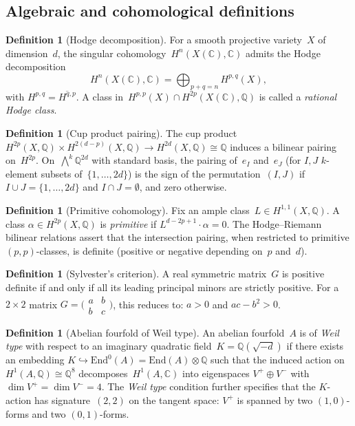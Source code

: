 \documentclass[11pt]{article}
\theoremstyle{plain}
\theoremstyle{definition}
\newtheorem{definition}[theorem]{Definition}
\theoremstyle{remark}
\newcommand{\Q}{\mathbb{Q}}
\newcommand{\C}{\mathbb{C}}
\newcommand{\End}{\mathrm{End}}
\begin{document}
\subsection{Algebraic and cohomological definitions}

\begin{definition}[Hodge decomposition]
For a smooth projective variety~$X$ of dimension~$d$, the singular
cohomology~$H^n(X(\C),\C)$ admits the Hodge decomposition
\[
  H^n(X(\C),\C) = \bigoplus_{p+q=n} H^{p,q}(X),
\]
with $H^{p,q} = \overline{H^{q,p}}$.  A class in~$H^{p,p}(X) \cap
H^{2p}(X(\C),\Q)$ is called a \emph{rational Hodge class}.
\end{definition}

\begin{definition}[Cup product pairing]
\label{def:cup}
The cup product
$H^{2p}(X,\Q) \times H^{2(d-p)}(X,\Q) \to H^{2d}(X,\Q) \cong \Q$
induces a bilinear pairing on~$H^{2p}$.  On~$\bigwedge^k \Q^{2d}$ with
standard basis, the pairing of~$e_I$ and~$e_J$ (for $I, J$ $k$-element
subsets of~$\{1,\ldots,2d\}$) is the sign of the permutation~$(I,J)$ if
$I \cup J = \{1,\ldots,2d\}$ and $I \cap J = \emptyset$, and zero otherwise.
\end{definition}

\begin{definition}[Primitive cohomology]
\label{def:primitive}
Fix an ample class~$L \in H^{1,1}(X,\Q)$.  A class
$\alpha \in H^{2p}(X,\Q)$ is \emph{primitive} if
$L^{d-2p+1} \cdot \alpha = 0$.  The Hodge--Riemann bilinear relations
assert that the intersection pairing, when restricted to primitive
$(p,p)$-classes, is definite (positive or negative depending on~$p$
and~$d$).
\end{definition}

\begin{definition}[Sylvester's criterion]
\label{def:sylvester}
A real symmetric matrix~$G$ is positive definite if and only if all its
leading principal minors are strictly positive.  For a $2 \times 2$ matrix
$G = \bigl(\begin{smallmatrix} a & b \\ b & c \end{smallmatrix}\bigr)$,
this reduces to: $a > 0$ and $ac - b^2 > 0$.
\end{definition}

\begin{definition}[Abelian fourfold of Weil type]
\label{def:weil-type}
An abelian fourfold~$A$ is of \emph{Weil type} with respect to an imaginary
quadratic field~$K = \Q(\sqrt{-d})$ if there exists an embedding
$K \hookrightarrow \End^0(A) = \End(A) \otimes \Q$ such that the induced
action on~$H^1(A,\Q) \cong \Q^8$ decomposes~$H^1(A,\C)$ into eigenspaces
$V^+ \oplus V^-$ with $\dim V^+ = \dim V^- = 4$.  The \emph{Weil type}
condition further specifies that the $K$-action has signature~$(2,2)$ on the
tangent space: $V^+$ is spanned by two $(1,0)$-forms and two $(0,1)$-forms.
\end{definition}
\end{document}
